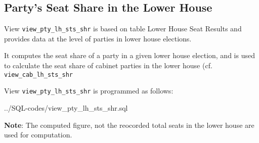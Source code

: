 \subsection{Party's Seat Share in the Lower House}\label{view_pty_lh_sts_shr}
View \texttt{\footnotesize view\_pty\_lh\_sts\_shr} is based on table Lower House Seat Results and provides data at the level of parties in lower house elections.

It computes the seat share of a party in a given lower house election, and is used to calculate the seat share of cabinet parties in the lower house (cf.  \texttt{\footnotesize view\_cab\_lh\_sts\_shr}

View \texttt{\footnotesize view\_pty\_lh\_sts\_shr} is programmed as follows:

%
{../SQL-codes/view_pty_lh_sts_shr.sql}


{\bf Note}: The computed figure, not the reocorded total seats in the lower house are used for computation.


